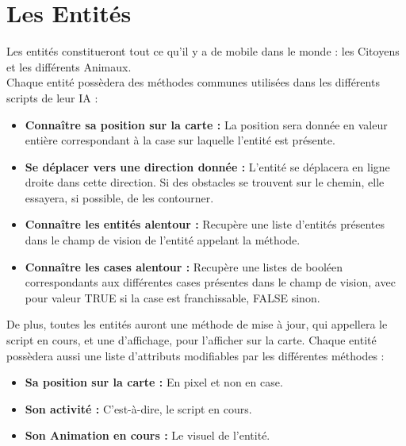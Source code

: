 \documentclass[a4paper]{article}
\newcommand{\alinea}{\hspace*{0.5cm}}
\begin{document}
    \section{Les Entités}
      \alinea Les entités constitueront tout ce qu'il y a de mobile dans le monde : les Citoyens et les différents Animaux.\\
      Chaque entité possèdera des méthodes communes utilisées dans les différents scripts de leur IA :
      \begin{itemize}
        \item \textbf{Connaître sa position sur la carte : } La position sera donnée en valeur entière correspondant à la case sur laquelle l'entité est présente.
        \item \textbf{Se déplacer vers une direction donnée : } L'entité se déplacera en ligne droite dans cette direction. Si des obstacles se trouvent sur le chemin, elle essayera, si possible, de les contourner.
        \item \textbf{Connaître les entités alentour : } Recupère une liste d'entités présentes dans le champ de vision de l'entité appelant la méthode.
        \item \textbf{Connaître les cases alentour : } Recupère une listes de booléen correspondants aux différentes cases présentes dans le champ de vision, avec pour valeur TRUE si la case est franchissable, FALSE sinon.
      \end{itemize}
      \alinea De plus, toutes les entités auront une méthode de mise à jour, qui appellera le script en cours, et une d'affichage, pour l'afficher sur la carte.
      \alinea Chaque entité possèdera aussi une liste d'attributs modifiables par les différentes méthodes : 
      \begin{itemize}
        \item \textbf{Sa position sur la carte : } En pixel et non en case.
        \item \textbf{Son activité : } C'est-à-dire, le script en cours.
        \item \textbf{Son Animation en cours : } Le visuel de l'entité.
      \end{itemize}
      
\end{document}
